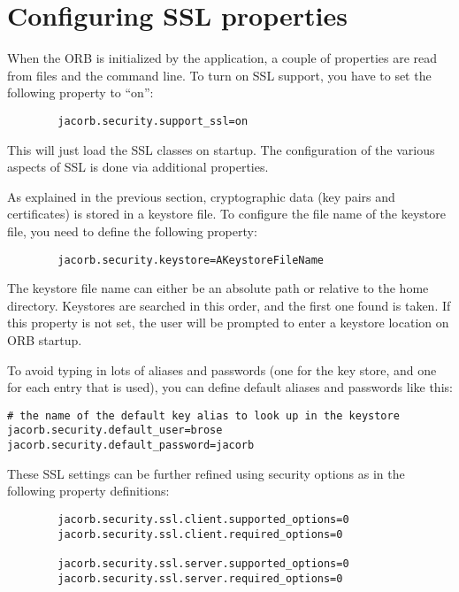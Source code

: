 \documentclass[12pt]{scrbook}
\begin{document}
\section{Configuring SSL properties}

When the ORB is initialized by the application, a couple of properties
are read from files and the  command line. To turn on SSL support, you have to
set the following property to ``on'':

\begin{verbatim}
        jacorb.security.support_ssl=on
\end{verbatim}

This will just load the SSL classes on startup. The configuration of the
various aspects of SSL is done via additional properties.

As explained  in the previous  section, cryptographic data  (key pairs
and  certificates) is  stored in  a  keystore  file. To configure the
file name of the keystore file, you need to define the following
property:

\begin{verbatim}
        jacorb.security.keystore=AKeystoreFileName
\end{verbatim}

The keystore file name can either be an absolute path or relative to
the home directory. Keystores are searched in this order, and the
first one found is taken. If this property is not set, the user will be
prompted to enter a keystore location on ORB startup.

To avoid  typing in  lots of  aliases and passwords  (one for  the key
store, and  one for each entry  that is used), you  can define default
aliases and passwords like this:

\begin{verbatim}
# the name of the default key alias to look up in the keystore
jacorb.security.default_user=brose
jacorb.security.default_password=jacorb
\end{verbatim}


These SSL settings can be further refined using security options as in
the following property definitions:

\begin{verbatim}
        jacorb.security.ssl.client.supported_options=0
        jacorb.security.ssl.client.required_options=0

        jacorb.security.ssl.server.supported_options=0
        jacorb.security.ssl.server.required_options=0
\end{verbatim}
\end{document}
